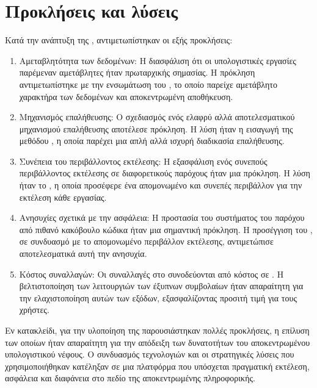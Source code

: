 \section{Προκλήσεις και λύσεις}
Κατά την ανάπτυξη της , αντιμετωπίστηκαν οι εξής προκλήσεις:
\begin{enumerate}
    \item Αμεταβλητότητα των δεδομένων: Η διασφάλιση ότι οι υπολογιστικές εργασίες παρέμεναν αμετάβλητες ήταν πρωταρχικής σημασίας. Η πρόκληση αντιμετωπίστηκε με την ενσωμάτωση του , το οποίο παρείχε αμετάβλητο χαρακτήρα των δεδομένων και αποκεντρωμένη αποθήκευση.
    \item Μηχανισμός επαλήθευσης: Ο σχεδιασμός ενός ελαφρύ αλλά αποτελεσματικού μηχανισμού επαλήθευσης αποτέλεσε πρόκληση. Η λύση ήταν η εισαγωγή της μεθόδου , η οποία παρέχει μια απλή αλλά ισχυρή διαδικασία επαλήθευσης.
    \item Συνέπεια του περιβάλλοντος εκτέλεσης: Η εξασφάλιση ενός συνεπούς περιβάλλοντος εκτέλεσης σε διαφορετικούς παρόχους ήταν μια πρόκληση. Η λύση ήταν το , η οποία προσέφερε ένα απομονωμένο και συνεπές περιβάλλον για την εκτέλεση κάθε εργασίας.
    \item Ανησυχίες σχετικά με την ασφάλεια: Η προστασία του συστήματος του παρόχου από πιθανό κακόβουλο κώδικα ήταν μια σημαντική πρόκληση. Η προσέγγιση του , σε συνδυασμό με το απομονωμένο περιβάλλον εκτέλεσης, αντιμετώπισε αποτελεσματικά αυτή την ανησυχία.
    \item Κόστος συναλλαγών: Οι συναλλαγές στο  συνοδεύονται από κόστος σε . Η βελτιστοποίηση των λειτουργιών των έξυπνων συμβολαίων ήταν απαραίτητη για την ελαχιστοποίηση αυτών των εξόδων, εξασφαλίζοντας προσιτή τιμή για τους χρήστες.
\end{enumerate}

Εν κατακλείδι, για την υλοποίηση της  παρουσιάστηκαν πολλές προκλήσεις, η επίλυση των οποίων ήταν απαραίτητη για την απόδειξη των δυνατοτήτων του αποκεντρωμένου υπολογιστικού νέφους. Ο συνδυασμός τεχνολογιών και οι στρατηγικές λύσεις που χρησιμοποιήθηκαν κατέληξαν σε μια πλατφόρμα που υπόσχεται πραγματική εκτέλεση, ασφάλεια και διαφάνεια στο πεδίο της αποκεντρωμένης πληροφορικής.